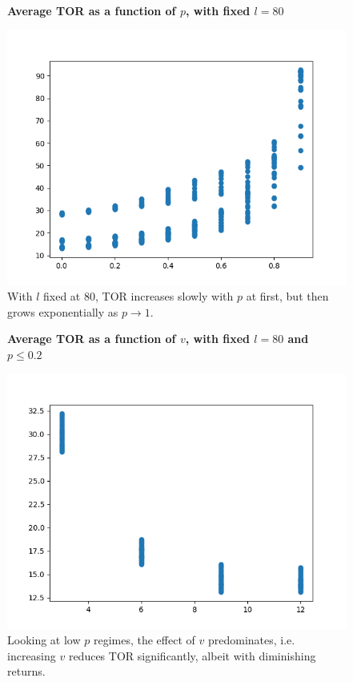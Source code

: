 \documentclass{article}
\begin{document}
\begin{figure}
\textbf{\large Average TOR as a function of $p$, with fixed $l=80$}\par\medskip
{}
\includegraphics[scale = 0.55, left]{./data/phase1/p_vs_timeOnRoad_l=80.png}
\vspace*{0.1cm}\hspace*{4.5cm}{\large $p$}
\caption{\label{fig} With $l$ fixed at 80, TOR increases slowly with $p$ at first, but then grows exponentially as $p \to 1$.}
\end{figure}

\begin{figure}
\textbf{\large Average TOR as a function of $v$, with fixed $l=80$ and $p \leq 0.2$}\par\medskip
{}
\includegraphics[scale = 0.55, left]{./data/phase1/v_vs_timeOnRoad_l=80_lowp.png}
\vspace*{0.1cm}\hspace*{4.5cm}{\large $v$}
\caption{\label{fig} Looking at low $p$ regimes, the effect of $v$ predominates, i.e. increasing $v$ reduces TOR significantly, albeit with diminishing returns.}
\end{figure}
\end{document}
